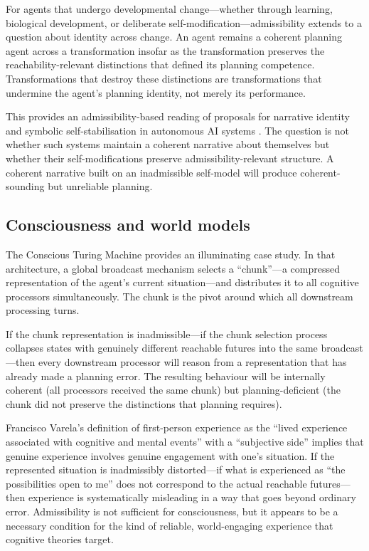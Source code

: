 \documentclass[11pt,a4paper]{article}
\begin{document}
For agents that undergo developmental change---whether through learning,
biological development, or deliberate self-modification---admissibility extends
to a question about identity across change. An agent remains a coherent
planning agent across a transformation insofar as the transformation preserves
the reachability-relevant distinctions that defined its planning competence.
Transformations that destroy these distinctions are transformations that
undermine the agent's planning identity, not merely its performance.

This provides an admissibility-based reading of proposals for narrative identity
and symbolic self-stabilisation in autonomous AI systems
\citep{graziano2013consciousness}. The question is not whether such systems
maintain a coherent narrative about themselves but whether their self-modifications
preserve admissibility-relevant structure. A coherent narrative built on an
inadmissible self-model will produce coherent-sounding but unreliable planning.

\subsection{Consciousness and world models}

The Conscious Turing Machine \citep{blum2022conscious} provides an illuminating
case study. In that architecture, a global broadcast mechanism selects a
``chunk''---a compressed representation of the agent's current situation---and
distributes it to all cognitive processors simultaneously. The chunk is the
pivot around which all downstream processing turns.

If the chunk representation is inadmissible---if the chunk selection process
collapses states with genuinely different reachable futures into the same
broadcast---then every downstream processor will reason from a representation
that has already made a planning error. The resulting behaviour will be
internally coherent (all processors received the same chunk) but planning-deficient
(the chunk did not preserve the distinctions that planning requires).

Francisco Varela's definition of first-person experience as the ``lived
experience associated with cognitive and mental events'' with a ``subjective
side'' \citep{varela1999first} implies that genuine experience involves genuine
engagement with one's situation. If the represented situation is inadmissibly
distorted---if what is experienced as ``the possibilities open to me'' does not
correspond to the actual reachable futures---then experience is systematically
misleading in a way that goes beyond ordinary error. Admissibility is not
sufficient for consciousness, but it appears to be a necessary condition for
the kind of reliable, world-engaging experience that cognitive theories target.
\end{document}
